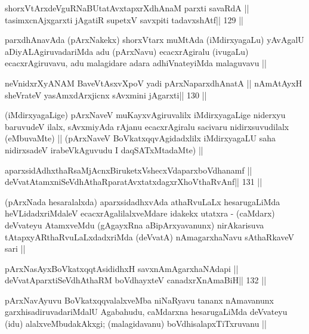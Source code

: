 \begin{shl}
shorxVtArxdeVguRNaBUtatAvxtapxrXdhAnaM parxti savaRdA ||
tasimxcnAjxgarxti jAgatiR supetxV savxpiti tadavxshAtf\hfill || 129 ||
\end{shl}

\begin{artha}
parxdhAnavAda (pArxNakekx) shorxVtarx muMtAda (iMdirxyagaLu) yAvAgalU aDiyALAgiruvadariMda adu (pArxNavu) ecacxrAgiralu (ivugaLu) ecacxrAgiruvavu, adu malagidare adara adhiVnateyiMda malaguvavu ||
\end{artha}

\begin{shl}
neVnidxrXyANAM BaveVtAsxvXpoV yadi pArxNaparxdhAnatA ||
nAmAtAyxH sheVrateV yasAmxdArxjicnx sAvxmini jAgarxti\hfill || 130 ||
\end{shl}

\begin{artha}
(iMdirxyagaLige) pArxNaveV muKayxvAgiruvalilx iMdirxyagaLige niderxyu 
baruvudeV ilalx, sAvxmiyAda rAjanu ecacxrAgiralu sacivaru nidirxsuvudilalx (eMbuvaMte) || (pArxNaveV BoVkatxqqvAgidadxlilx iMdirxyagaLU saha nidirxsadeV irabeVkAguvudu I daqSATxMtadaMte) ||
\end{artha}


\begin{shl}
aparxsidAdhxthaRsaMjAcnxBiruketxVshecxVdaparxboVdhanamf ||
deVvatAtamxniSeVdhAthaRparatAvxtatxdagxrXhoV\s thaRvAnf\hfill || 131 ||
\end{shl}

\begin{artha}
(pArxNada hesaralalxda) aparxsidadhxvAda athaRvuLaLx hesarugaLiMda 
heVLidadxriMdaleV ecacxrAgalilalxveMdare idakekx utatxra - (caMdarx) deVvateyu AtamxveMdu (gAgayxRna aBipArxyavanunx) nirAkarisuva tAtapxyARthaRvuLaLxdadxriMda (deVvatA) nAmagarxhaNavu sAthaRkaveV sari ||
\end{artha}


\begin{shl}
pArxNasAyxBoVkatxqqtAsididhxH savxnAmAgarxhaNAdapi ||
deVvatAparxtiSeVdhAthaRM boVdhayxteV  canadxrXnAmaBiH\hfill || 132 ||
\end{shl}

\begin{artha}
pArxNavAyuvu BoVkatxqqvalalxveMba niNaRyavu tananx nAmavanunx garxhisadiruvadariMdalU Agabahudu, caMdarxna hesarugaLiMda deVvateyu (idu) alalxveMbudakAkxgi; (malagidavanu) boVdhisalapxTiTxruvanu ||
\end{artha}

